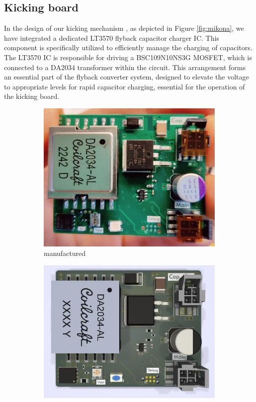 \documentclass[runningheads]{llncs}
\begin{document}
\subsection{Kicking board}
In the design of our kicking mechanism \cite{ref_mikona}, as depicted in Figure \ref{fig:mikona}, we have integrated a dedicated LT3570 flyback capacitor charger IC. This component is specifically utilized to efficiently manage the charging of capacitors. The LT3570 IC is responsible for driving a BSC109N10NS3G MOSFET, which is connected to a DA2034 transformer within the circuit. This arrangement forms an essential part of the flyback converter system, designed to elevate the voltage to appropriate levels for rapid capacitor charging, essential for the operation of the kicking board.
\begin{figure}
    \centering
    \begin{subfigure}[b]{0.45\textwidth}
         \centering
         \includegraphics[width=\textwidth]{images/mikona.jpg}
         \caption{manufactured}
    \end{subfigure}
    \hfill
    \begin{subfigure}[b]{0.5\textwidth}
        \centering
        \includegraphics[width=\textwidth]{images/mikona-render.jpg}

\end{subfigure}
\end{figure}
\end{document}

